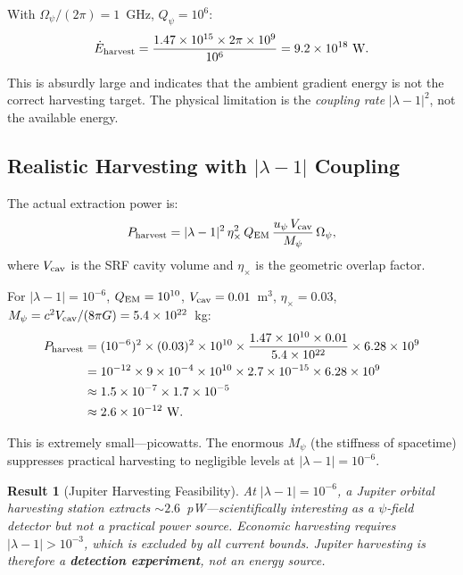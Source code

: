 \documentclass[aps,prd,twocolumn,superscriptaddress]{revtex4-2}
\newcommand{\Qpsi}{Q_\psi}
\newcommand{\Opsi}{\Omega_\psi}
\newtheorem{result}{Result}
\begin{document}
With $\Opsi/(2\pi) = 1$~GHz, $\Qpsi = 10^6$:
\begin{equation}
\dot{E}_{\rm harvest} = \frac{1.47\times 10^{15}\times 2\pi\times 10^9}{10^6}
= 9.2\times 10^{18}~\text{W}.
\end{equation}

This is absurdly large and indicates that the ambient gradient energy
is not the correct harvesting target.  The physical limitation is the
\emph{coupling rate} $|\lambda-1|^2$, not the available energy.

\subsection{Realistic Harvesting with $|\lambda-1|$ Coupling}

The actual extraction power is:
\begin{equation}
P_{\rm harvest} = |\lambda-1|^2\,\eta_\times^2\,Q_{\rm EM}\,
\frac{u_\psi\,V_{\rm cav}}{M_\psi}\,\Opsi,
\end{equation}
where $V_{\rm cav}$ is the SRF cavity volume and $\eta_\times$ is
the geometric overlap factor.

For $|\lambda-1| = 10^{-6}$, $Q_{\rm EM} = 10^{10}$,
$V_{\rm cav} = 0.01$~m$^3$, $\eta_\times = 0.03$,
$M_\psi = c^2 V_{\rm cav}/(8\pi G) = 5.4\times 10^{22}$~kg:
\begin{align}
P_{\rm harvest} &= (10^{-6})^2\times(0.03)^2\times 10^{10}
\times\frac{1.47\times 10^{10}\times 0.01}{5.4\times 10^{22}}
\times 6.28\times 10^9 \notag\\
&= 10^{-12}\times 9\times 10^{-4}\times 10^{10}
\times 2.7\times 10^{-15}\times 6.28\times 10^9 \notag\\
&\approx 1.5\times 10^{-7}\times 1.7\times 10^{-5} \notag\\
&\approx 2.6\times 10^{-12}~\text{W}.
\end{align}

This is extremely small---picowatts.  The enormous $M_\psi$ (the
stiffness of spacetime) suppresses practical harvesting to negligible
levels at $|\lambda-1| = 10^{-6}$.

\begin{result}[Jupiter Harvesting Feasibility]
At $|\lambda-1| = 10^{-6}$, a Jupiter orbital harvesting station
extracts $\sim 2.6$~pW---scientifically interesting as a $\psi$-field
detector but not a practical power source.  Economic harvesting
requires $|\lambda-1| > 10^{-3}$, which is excluded by all current
bounds.  Jupiter harvesting is therefore a \textbf{detection
experiment}, not an energy source.
\end{result}
\end{document}
